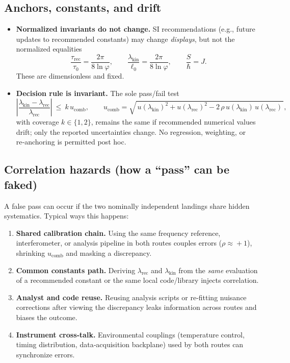 \documentclass[11pt]{article}
\begin{document}
\subsection*{Anchors, constants, and drift}
\begin{itemize}
  \item \textbf{Normalized invariants do not change.} SI recommendations (e.g., future updates to recommended constants) may change \emph{displays}, but not the normalized equalities
  \[
    \frac{\tau_{\mathrm{rec}}}{\tau_{0}}=\frac{2\pi}{8\ln\varphi},
    \qquad
    \frac{\lambda_{\mathrm{kin}}}{\ell_{0}}=\frac{2\pi}{8\ln\varphi},
    \qquad
    \frac{S}{\hbar}=J.
  \]
  These are dimensionless and fixed.
  \item \textbf{Decision rule is invariant.} The sole pass/fail test
  \[
    \left|\frac{\lambda_{\mathrm{kin}}-\lambda_{\mathrm{rec}}}{\lambda_{\mathrm{rec}}}\right|\ \le\ k\,u_{\mathrm{comb}},
    \qquad 
    u_{\mathrm{comb}}=
    \sqrt{\,u(\lambda_{\mathrm{kin}})^{2}+u(\lambda_{\mathrm{rec}})^{2}-2\,\rho\,u(\lambda_{\mathrm{kin}})\,u(\lambda_{\mathrm{rec}})\,},
  \]
  with coverage \(k\in\{1,2\}\), remains the same if recommended numerical values drift; only the reported uncertainties change. No regression, weighting, or re‑anchoring is permitted post hoc.
\end{itemize}

\subsection*{Correlation hazards (how a “pass” can be faked)}
A false pass can occur if the two nominally independent landings share hidden systematics. Typical ways this happens:
\begin{enumerate}
  \item \textbf{Shared calibration chain.} Using the same frequency reference, interferometer, or analysis pipeline in both routes couples errors (\(\rho\!\approx\!+1\)), shrinking \(u_{\mathrm{comb}}\) and masking a discrepancy.
  \item \textbf{Common constants path.} Deriving \(\lambda_{\mathrm{rec}}\) and \(\lambda_{\mathrm{kin}}\) from the \emph{same} evaluation of a recommended constant or the same local code/library injects correlation.
  \item \textbf{Analyst and code reuse.} Reusing analysis scripts or re‑fitting nuisance corrections after viewing the discrepancy leaks information across routes and biases the outcome.
  \item \textbf{Instrument cross‑talk.} Environmental couplings (temperature control, timing distribution, data‑acquisition backplane) used by both routes can synchronize errors.
\end{enumerate}
\end{document}
